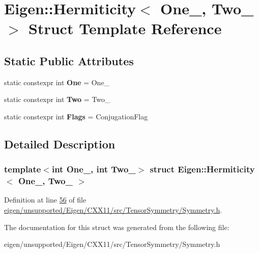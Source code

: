 \hypertarget{struct_eigen_1_1_hermiticity}{}\section{Eigen\+:\+:Hermiticity$<$ One\+\_\+, Two\+\_\+ $>$ Struct Template Reference}
\label{struct_eigen_1_1_hermiticity}
\subsection*{Static Public Attributes}
\begin{DoxyCompactItemize}
\item 
\mbox{\label{struct_eigen_1_1_hermiticity_a1261ef365cc2e055683094126b0907b9}} 
static constexpr int {\bfseries One} = One\+\_\+
\item 
\mbox{\label{struct_eigen_1_1_hermiticity_afc0feebdd8c81858a9b4b849d55eca02}} 
static constexpr int {\bfseries Two} = Two\+\_\+
\item 
\mbox{\label{struct_eigen_1_1_hermiticity_ac579e2c01376a7ae0ca14e837478bd8b}} 
static constexpr int {\bfseries Flags} = Conjugation\+Flag
\end{DoxyCompactItemize}


\subsection{Detailed Description}
\subsubsection*{template$<$int One\+\_\+, int Two\+\_\+$>$\newline
struct Eigen\+::\+Hermiticity$<$ One\+\_\+, Two\+\_\+ $>$}



Definition at line \hyperlink{eigen_2unsupported_2_eigen_2_c_x_x11_2src_2_tensor_symmetry_2_symmetry_8h_source_l00056}{56} of file \hyperlink{eigen_2unsupported_2_eigen_2_c_x_x11_2src_2_tensor_symmetry_2_symmetry_8h_source}{eigen/unsupported/\+Eigen/\+C\+X\+X11/src/\+Tensor\+Symmetry/\+Symmetry.\+h}.



The documentation for this struct was generated from the following file\+:\begin{DoxyCompactItemize}
\item 
eigen/unsupported/\+Eigen/\+C\+X\+X11/src/\+Tensor\+Symmetry/\+Symmetry.\+h\end{DoxyCompactItemize}
